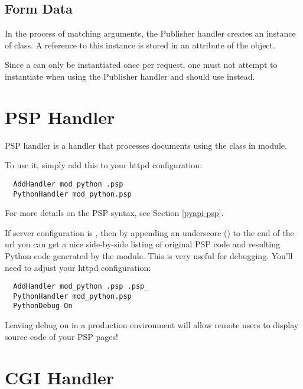 \subsection{Form Data}

In the process of matching arguments, the Publisher handler creates an
instance of 
class. A reference to this instance is stored in an attribute 
of the  object.

Since a  can only be instantiated once per
request, one must not attempt to instantiate  when
using the Publisher handler and should use
 instead.


\section{PSP Handler\label{hand-psp}}

PSP handler is a handler that processes documents using the
 class in  module.

To use it, simply add this to your httpd configuration: 

\begin{verbatim}
  AddHandler mod_python .psp
  PythonHandler mod_python.psp
\end{verbatim}

For more details on the PSP syntax, see Section \ref{pyapi-psp}.

If  server configuration is , then by
appending an underscore (\samp{_}) to the end of the url you can get a
nice side-by-side listing of original PSP code and resulting Python
code generated by the  module. This is very useful for
debugging. You'll need to adjust your httpd configuration:

\begin{verbatim}
  AddHandler mod_python .psp .psp_
  PythonHandler mod_python.psp
  PythonDebug On
\end{verbatim}

\begin{notice}
Leaving debug on in a production environment will allow remote users
to display source code of your PSP pages!
\end{notice}

\section{CGI Handler\label{hand-cgi}}

